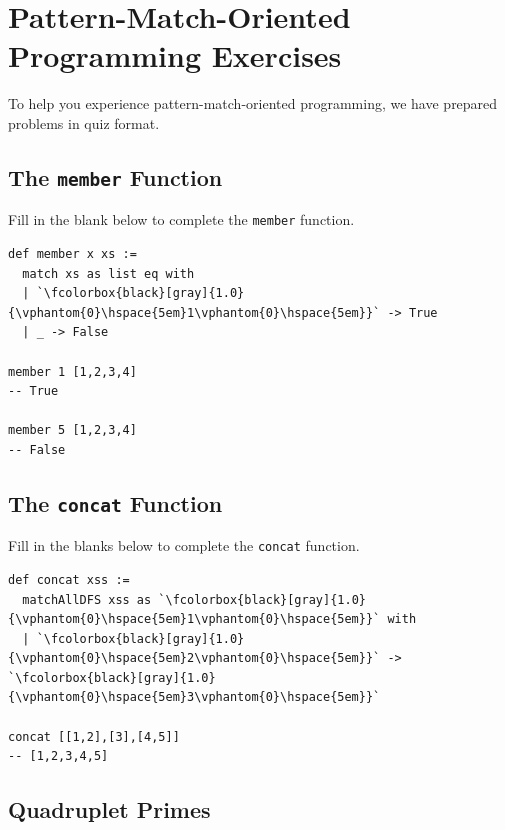\chapter{Pattern-Match-Oriented Programming Exercises}

To help you experience pattern-match-oriented programming, we have prepared problems in quiz format.

\section*{The \texttt{member} Function}

Fill in the blank below to complete the \lstinline{member} function.

\begin{lstlisting}[language=egison]
def member x xs :=
  match xs as list eq with
  | `\fcolorbox{black}[gray]{1.0}{\vphantom{0}\hspace{5em}1\vphantom{0}\hspace{5em}}` -> True
  | _ -> False

member 1 [1,2,3,4]
-- True

member 5 [1,2,3,4]
-- False
\end{lstlisting}

\section*{The \texttt{concat} Function}

Fill in the blanks below to complete the \lstinline{concat} function.

\begin{lstlisting}[language=egison]
def concat xss :=
  matchAllDFS xss as `\fcolorbox{black}[gray]{1.0}{\vphantom{0}\hspace{5em}1\vphantom{0}\hspace{5em}}` with
  | `\fcolorbox{black}[gray]{1.0}{\vphantom{0}\hspace{5em}2\vphantom{0}\hspace{5em}}` -> `\fcolorbox{black}[gray]{1.0}{\vphantom{0}\hspace{5em}3\vphantom{0}\hspace{5em}}`

concat [[1,2],[3],[4,5]]
-- [1,2,3,4,5]
\end{lstlisting}

\section*{Quadruplet Primes}


